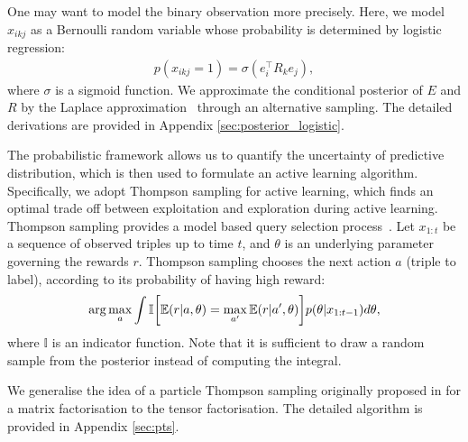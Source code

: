  One may want to model the binary observation more precisely.
Here, we model $x_{ikj}$ as a Bernoulli random variable whose
probability is determined by logistic regression:
\begin{align}
p(x_{ikj}=1) = \sigma(e_i^{\top} R_k e_j), \label{eqn:logit_triple_gen}
\end{align}
where $\sigma$ is a sigmoid function.
We approximate the conditional posterior of
$E$ and $R$ by the Laplace approximation~\cite{bishop2006pattern} through an alternative sampling. The detailed derivations are provided in Appendix \ref{sec:posterior_logistic}.

 The probabilistic framework allows us to quantify the uncertainty of predictive distribution, which is then used to formulate an active learning algorithm. Specifically, we adopt Thompson sampling for active learning, which finds an optimal trade off between exploitation and exploration during active learning.
Thompson sampling provides a model based query selection process~\cite{li11thompson,scott10bandit}. Let $x_{1:t}$ be a sequence of observed triples up to time $t$, and $\theta$ is an underlying parameter governing the rewards $r$.
Thompson sampling chooses the next action $a$ (triple to label),
according to its probability of having high reward:
\begin{align}
\arg\max_a \int \mathbb{I}\bigg[ \mathbb{E}(r|a, \theta)
= \max_{a'}\mathbb{E}(r|a',\theta) \bigg] p(\theta|x_{1:t-1}) d\theta, \notag
\end{align}
where $\mathbb{I}$ is an indicator function. Note that it is sufficient
to draw a random sample from the posterior instead of computing the integral.

We generalise the idea of a particle Thompson sampling originally proposed in \cite{kawale2015efficient} for a matrix factorisation to the tensor factorisation. The detailed algorithm is provided in Appendix \ref{sec:pts}.

